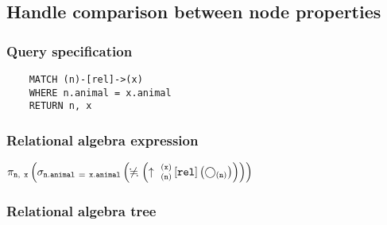 	\subsection{Handle comparison between node properties}

	\subsubsection*{Query specification}

	\begin{lstlisting}
	MATCH (n)-[rel]->(x)
	WHERE n.animal = x.animal
	RETURN n, x
	\end{lstlisting}


	\subsubsection*{Relational algebra expression}

	$\projection{\var{n},~\var{x}} \left(\selection{\mathtt{n.animal~=~x.animal}} \left(\alldifferent{} \left(\expandout{n}{x}{}{rel}{} \left(\getvertices{n}{}\right)\right)\right)\right)$

	\subsubsection*{Relational algebra tree}


